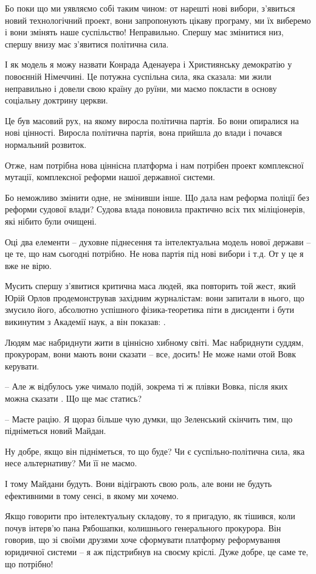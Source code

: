 Бо поки що ми уявляємо собі таким чином: от нарешті нові вибори, з’явиться
новий технологічний проект, вони запропонують цікаву програму, ми їх виберемо і
вони змінять наше суспільство! Неправильно. Спершу має змінитися низ, спершу
внизу має з’явитися політична сила. 

І як модель я можу назвати Конрада Аденауера і Християнську демократію у
повоєнній Німеччині. Це потужна суспільна сила, яка сказала: ми жили
неправильно і довели свою країну до руїни, ми маємо покласти в основу соціальну
доктрину церкви. 

Це був масовий рух, на якому виросла політична партія. Бо вони опиралися на
нові цінності. Виросла політична партія, вона прийшла до влади і почався
нормальний розвиток. 

Отже, нам потрібна нова ціннісна платформа і нам потрібен проект комплексної
мутації, комплексної реформи нашої державної системи. 

Бо неможливо змінити одне, не змінивши інше. Що дала нам реформа поліції без
реформи судової влади? Судова влада поновила практично всіх тих міліціонерів,
які нібито були очищені. 

Оці два елементи – духовне піднесення та інтелектуальна модель нової держави –
це те, що нам сьогодні потрібно. Не нова партія під нові вибори і т.д. От у це
я вже не вірю. 

Мусить спершу з’явитися критична маса людей, яка повторить той жест, який Юрій
Орлов продемонстрував західним журналістам: вони запитали в нього, що змусило
його, абсолютно успішного фізика-теоретика піти в дисиденти і бути викинутим з
Академії наук, а він показав: . 

Людям має набриднути жити в ціннісно хибному світі. Має набриднути суддям,
прокурорам, вони мають вони сказати – все, досить! Не може нами отой Вовк
керувати.

– Але ж відбулось уже чимало подій, зокрема ті ж плівки Вовка, після яких можна
сказати . Що ще має статись?

– Маєте рацію. Я щораз більше чую думки, що Зеленський скінчить тим, що
підніметься новий Майдан. 

Ну добре, якщо він підніметься, то що буде? Чи є суспільно-політична сила, яка
несе альтернативу? Ми її не маємо. 

І тому Майдани будуть. Вони відіграють свою роль, але вони не будуть
ефективними в тому сенсі, в якому ми хочемо. 

Якщо говорити про інтелектуальну складову, то я пригадую, як тішився, коли
почув інтерв’ю пана Рябошапки, колишнього генерального прокурора. Він говорив,
що зі своїми друзями хоче сформувати платформу реформування юридичної системи –
я аж підстрибнув на своєму кріслі. Дуже добре, це саме те, що потрібно!

